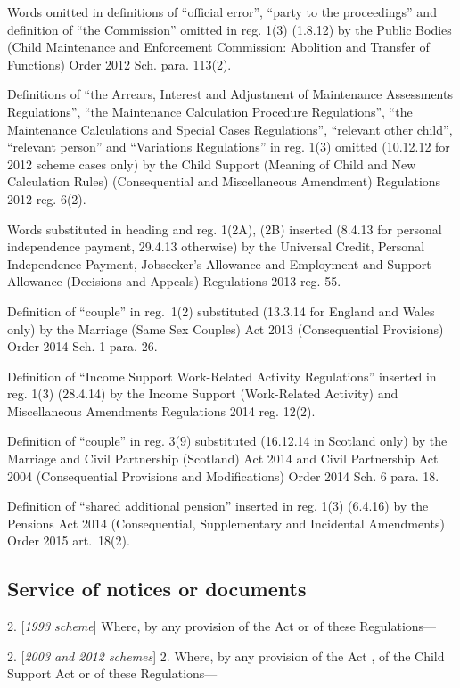 \documentclass[12pt,a4paper]{article}
\begin{document}
{Words omitted in definitions of ``official error'', ``party to the proceedings'' and definition of ``the Commission'' omitted in reg. 1(3) (1.8.12) by the Public Bodies (Child Maintenance and Enforcement Commission: Abolition and Transfer of Functions) Order 2012 Sch. para. 113(2).

Definitions of ``the Arrears, Interest and Adjustment of Maintenance Assessments Regulations'', ``the Maintenance Calculation Procedure Regulations'', ``the Maintenance Calculations and Special Cases Regulations'', ``relevant other child'', ``relevant person'' and ``Variations Regulations'' in reg. 1(3) omitted (10.12.12 for 2012 scheme cases only) by the Child Support (Meaning of Child and New Calculation Rules) (Consequential and Miscellaneous Amendment) Regulations 2012 reg. 6(2).

Words substituted in heading and reg. 1(2A), (2B) inserted (8.4.13 for personal independence payment, 29.4.13 otherwise) by the Universal Credit, Personal Independence Payment, Jobseeker's Allowance and Employment and Support Allowance (Decisions and Appeals) Regulations 2013 reg. 55.

Definition of ``couple'' in reg.~1(2) substituted (13.3.14 for England and Wales only) by the Marriage (Same Sex Couples) Act 2013 (Consequential Provisions) Order 2014 Sch. 1 para. 26.

Definition of ``Income Support Work-Related Activity Regulations'' inserted in reg. 1(3) (28.4.14) by the Income Support (Work-Related Activity) and Miscellaneous Amendments Regulations 2014 reg. 12(2).

Definition of ``couple'' in reg. 3(9) substituted (16.12.14 in Scotland only) by the Marriage and Civil Partnership (Scotland) Act 2014 and Civil Partnership Act 2004 (Consequential Provisions and Modifications) Order 2014 Sch. 6 para. 18.

Definition of ``shared additional pension'' inserted in reg. 1(3) (6.4.16) by the Pensions Act 2014 (Consequential, Supplementary and Incidental Amendments) Order 2015 art.~18(2).
}

\subsection[2. Service of notices or documents]{Service of notices or documents}

2.  [\emph{1993 scheme}] Where, by any provision of the Act or of these Regulations—

2.  [\emph{2003 and 2012 schemes}] 2.  Where, by any provision of the Act%
, of the Child Support Act
or of these Regulations—
\end{document}
